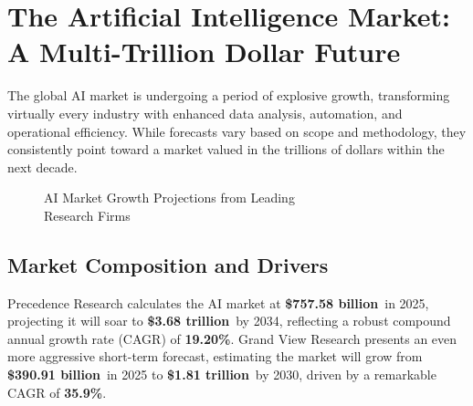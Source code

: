 \documentclass[11pt,a4paper]{report}
\newcommand{\marketvalue}[2]{\textcolor{trust}{\textbf{\$#1}}\,\textcolor{darkgray}{#2}}
\newcommand{\cagr}[1]{\textcolor{sun}{\textbf{#1\%}}}
\begin{document}
\section{The Artificial Intelligence Market: A Multi-Trillion Dollar Future}

The global AI market is undergoing a period of explosive growth, transforming virtually every industry with enhanced data analysis, automation, and operational efficiency. While forecasts vary based on scope and methodology, they consistently point toward a market valued in the trillions of dollars within the next decade.

\begin{figure}[H]
\centering
{}
\caption{AI Market Growth Projections from Leading\\Research Firms}
\end{figure}
\subsection{Market Composition and Drivers}

Precedence Research calculates the AI market at \marketvalue{757.58 billion}{} in 2025, projecting it will soar to \marketvalue{3.68 trillion}{} by 2034, reflecting a robust compound annual growth rate (CAGR) of \cagr{19.20}. Grand View Research presents an even more aggressive short-term forecast, estimating the market will grow from \marketvalue{390.91 billion}{} in 2025 to \marketvalue{1.81 trillion}{} by 2030, driven by a remarkable CAGR of \cagr{35.9}.
\end{document}
